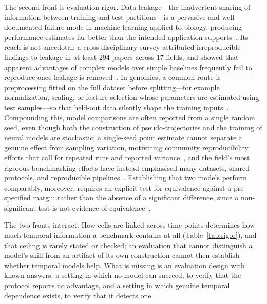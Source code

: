 \documentclass[pdflatex,sn-mathphys-num]{sn-jnl}
\theoremstyle{thmstyleone}%
\theoremstyle{thmstyletwo}%
\theoremstyle{thmstylethree}%
\begin{document}
The second front is evaluation rigor. Data leakage---the inadvertent sharing of information between training and test partitions---is a pervasive and well-documented failure mode in machine learning applied to biology, producing performance estimates far better than the intended application supports~\cite{whalen2022navigating,bernett2024guiding}. Its reach is not anecdotal: a cross-disciplinary survey attributed irreproducible findings to leakage in at least $294$ papers across $17$ fields, and showed that apparent advantages of complex models over simple baselines frequently fail to reproduce once leakage is removed~\cite{kapoor2023leakage}. In genomics, a common route is preprocessing fitted on the full dataset before splitting---for example normalization, scaling, or feature selection whose parameters are estimated using test samples---so that held-out data silently shape the training inputs~\cite{whalen2022navigating}. Compounding this, model comparisons are often reported from a single random seed, even though both the construction of pseudo-trajectories and the training of neural models are stochastic; a single-seed point estimate cannot separate a genuine effect from sampling variation, motivating community reproducibility efforts that call for repeated runs and reported variance~\cite{pineau2021improving}, and the field's most rigorous benchmarking efforts have instead emphasised many datasets, shared protocols, and reproducible pipelines~\cite{saelens2019comparison}. Establishing that two models perform comparably, moreover, requires an explicit test for equivalence against a pre-specified margin rather than the absence of a significant difference, since a non-significant test is not evidence of equivalence~\cite{lakens2017equivalence}.

The two fronts interact. How cells are linked across time points determines how much temporal information a benchmark contains at all (Table~\ref{tab:rigor}), and that ceiling is rarely stated or checked; an evaluation that cannot distinguish a model's skill from an artifact of its own construction cannot then establish whether temporal models help. What is missing is an evaluation design with known answers: a setting in which no model can succeed, to verify that the protocol reports no advantage, and a setting in which genuine temporal dependence exists, to verify that it detects one.
\end{document}
